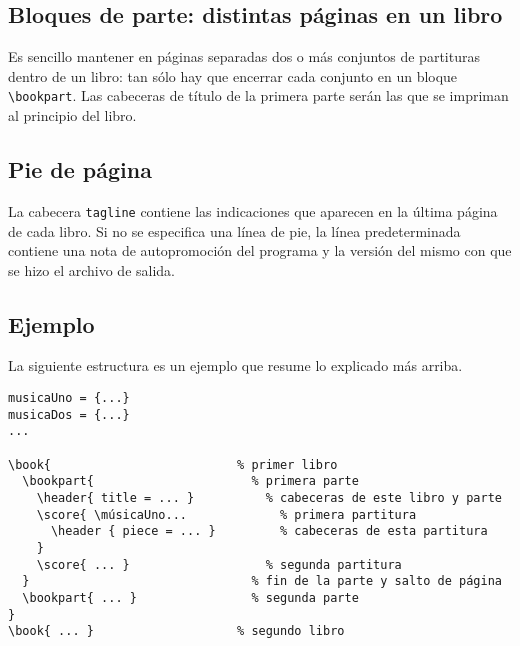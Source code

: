 \subsection{Bloques de parte: distintas páginas en un libro}

Es sencillo mantener en páginas separadas dos o más conjuntos de
partituras dentro de un libro: tan sólo hay que encerrar cada conjunto
en un bloque \verb+\bookpart+.  Las cabeceras de título de la primera
parte serán las que se impriman al principio del libro.

\subsection{Pie de página}
\label{tagline}

La cabecera \verb+tagline+ contiene las indicaciones que aparecen en
la última página de cada libro.  Si no se especifica una línea de pie,
la línea predeterminada contiene una nota de autopromoción del
programa y la versión del mismo con que se hizo el archivo de salida.

\subsection{Ejemplo}

La siguiente estructura es un ejemplo que resume lo explicado más
arriba.

\begin{verbatim}
musicaUno = {...}
musicaDos = {...}
...

\book{                          % primer libro
  \bookpart{                      % primera parte
    \header{ title = ... }          % cabeceras de este libro y parte  
    \score{ \músicaUno...             % primera partitura
      \header { piece = ... }         % cabeceras de esta partitura  
    }
    \score{ ... }                   % segunda partitura
  }                               % fin de la parte y salto de página
  \bookpart{ ... }                % segunda parte
}
\book{ ... }                    % segundo libro
\end{verbatim}

